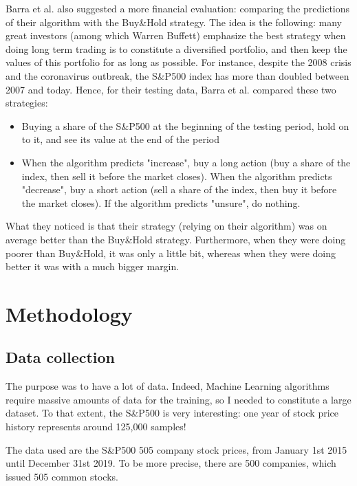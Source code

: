 \documentclass[11pt]{article}
\begin{document}
\begin{onehalfspace}
Barra et al. \cite{barra} also suggested a more financial evaluation: comparing the predictions of their algorithm with the Buy\&Hold strategy. The idea is the following: many great investors (among which Warren Buffett) emphasize the best strategy when doing long term trading is to constitute a diversified portfolio, and then keep the values of this portfolio for as long as possible. For instance, despite the 2008 crisis and the coronavirus outbreak, the S\&P500 index has more than doubled between 2007 and today. Hence, for their testing data, Barra et al. compared these two strategies:

\begin{itemize}
    \item Buying a share of the S\&P500 at the beginning of the testing period, hold on to it, and see its value at the end of the period
    \item When the algorithm predicts "increase", buy a long action (buy a share of the index, then sell it before the market closes). When the algorithm predicts "decrease", buy a short action (sell a share of the index, then buy it before the market closes). If the algorithm predicts "unsure", do nothing. 
\end{itemize}

What they noticed is that their strategy (relying on their algorithm) was on average better than the Buy\&Hold strategy. Furthermore, when they were doing poorer than Buy\&Hold, it was only a little bit, whereas when they were doing better it was with a much bigger margin. 

\pagebreak

\section{Methodology}

\subsection{Data collection}

The purpose was to have a lot of data. Indeed, Machine Learning algorithms require massive amounts of data for the training, so I needed to constitute a large dataset. To that extent, the S\&P500 is very interesting: one year of stock price history represents around 125,000 samples!

The data used are the S\&P500 505 company stock prices, from January 1st 2015 until December 31st 2019. To be more precise, there are 500 companies, which issued 505 common stocks.


\end{onehalfspace}
\end{document}
